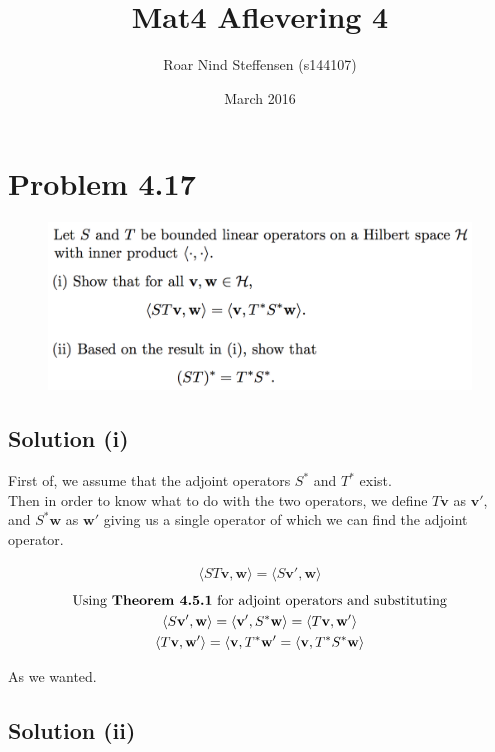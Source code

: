 \documentclass{article}
\title{Mat4 Aflevering 4}
\author{Roar Nind Steffensen (s144107)}
\date{March 2016}
\begin{document}
\maketitle

\section*{Problem 4.17}

\begin{figure}[h!]
    \centering
    \includegraphics[width=\textwidth]{fig/prob417.png}
\end{figure}

\subsection*{Solution (i)}
First of, we assume that the adjoint operators $S^\ast$ and $T^\ast$ exist.\\
Then in order to know what to do with the two operators, we define $T\mathbf{v}$ as $\mathbf{v'}$, and $S^\ast\mathbf{w}$ as $\mathbf{w'}$ giving us a single operator of which we can find the adjoint operator.

\begin{gather*}
   \langle S T \mathbf{v},\mathbf{w}\rangle = \langle S \mathbf{v'},\mathbf{w}\rangle
\end{gather*}
\begin{gather*}
    \text{Using \textbf{Theorem 4.5.1} for adjoint operators and substituting} \\
   \langle S \mathbf{v'}, \mathbf{w} \rangle = \langle \mathbf{v'}, S^\ast \mathbf{w} \rangle = \langle T\mathbf{v}, \mathbf{w'} \rangle \\
    \langle T\mathbf{v}, \mathbf{w'} \rangle = \langle \mathbf{v}, T^\ast \mathbf{w'}= \langle \mathbf{v}, T^\ast S^\ast \mathbf{w} \rangle 
\end{gather*}

As we wanted.

\subsection*{Solution (ii)}
\end{document}
